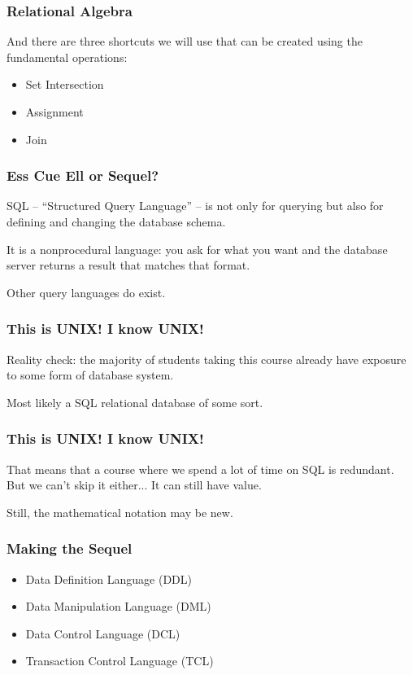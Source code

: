 \begin{frame}
\frametitle{Relational Algebra}


And there are three shortcuts we will use that can be created using the fundamental operations: 

\begin{itemize}
	\item Set Intersection
	\item Assignment
	\item Join
\end{itemize}


\end{frame}



\begin{frame}
\frametitle{Ess Cue Ell or Sequel?}

SQL -- ``Structured Query Language'' -- is not only for querying but also for defining and changing the database schema. 

It is a nonprocedural language: you ask for what you want and the database server returns a result that matches that format.

Other query languages do exist.

\end{frame}



\begin{frame}
\frametitle{This is UNIX! I know UNIX!}

Reality check: the majority of students taking this course already have exposure to some form of database system. 

Most likely a SQL relational database of some sort. 

\end{frame}



\begin{frame}
\frametitle{This is UNIX! I know UNIX!}

That means that a course where we spend a lot of time on SQL is redundant.\\
\quad But we can't skip it either... It can still have value.

Still, the mathematical notation may be new.

\end{frame}



\begin{frame}
\frametitle{Making the Sequel}


\begin{itemize}
	\item Data Definition Language (DDL) 
	\item Data Manipulation Language (DML)
	\item Data Control Language (DCL)
	\item Transaction Control Language (TCL)
\end{itemize}


\end{frame}


